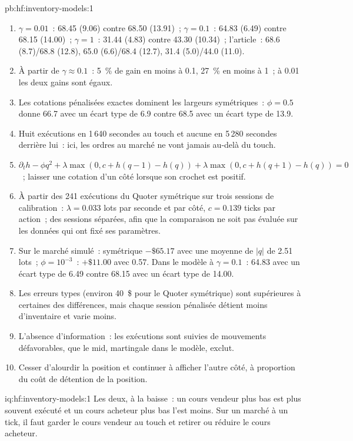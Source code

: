 \begin{solution}{pb:hf:inventory-models:1}
\begin{enumerate}
\item $\gamma=0.01$~: 68.45 (9.06) contre 68.50 (13.91)~; $\gamma=0.1$~: 64.83 (6.49) contre 68.15 (14.00)~; $\gamma=1$~: 31.44 (4.83) contre 43.30
(10.34)~; l'article~: 68.6 (8.7)/68.8 (12.8), 65.0 (6.6)/68.4 (12.7), 31.4 (5.0)/44.0 (11.0).
\item À partir de $\gamma\approx0.1$~: 5~\% de gain en moins à 0.1, 27~\% en moins à 1~; à 0.01 les deux gains sont égaux.
\item Les cotations pénalisées exactes dominent les largeurs symétriques~: $\phi=0.5$ donne 66.7 avec un écart type de 6.9 contre 68.5 avec un écart type de 13.9.
\item Huit exécutions en 1\,640 secondes au touch et aucune en 5\,280 secondes derrière lui~: ici, les ordres au marché ne vont jamais au-delà du touch.
\item $\partial_th-\phi q^2+\lambda\max(0,c+h(q-1)-h(q))+\lambda\max(0,c+h(q+1)-h(q))=0$~; laisser une cotation d'un côté lorsque son crochet est positif.
\item À partir des 241 exécutions du Quoter symétrique sur trois sessions de calibration~: $\lambda=0.033$ lots par seconde et par côté, $c=0.139$ ticks par action~; des sessions
séparées, afin que la comparaison ne soit pas évaluée sur les données qui ont fixé ses paramètres.
\item Sur le marché simulé~: symétrique $-\$65.17$ avec une moyenne de $|q|$ de 2.51 lots~; $\phi=10^{-3}$~: $+\$11.00$ avec 0.57. Dans le modèle à $\gamma=0.1$~:
64.83 avec un écart type de 6.49 contre 68.15 avec un écart type de 14.00.
\item Les erreurs types (environ 40~\$ pour le Quoter symétrique) sont supérieures à certaines des différences, mais chaque session pénalisée détient moins
d'inventaire et varie moins.
\item L'absence d'information~: les exécutions sont suivies de mouvements défavorables, que le mid, martingale dans le modèle, exclut.
\item Cesser d'alourdir la position et continuer à afficher l'autre côté, à proportion du coût de détention de la position.
\end{enumerate}
\end{solution}

\begin{solution}{iq:hf:inventory-models:1}
Les deux, à la baisse~: un cours vendeur plus bas est plus souvent exécuté et un cours acheteur plus bas l'est moins. Sur un marché à un tick, il faut garder le cours vendeur au touch et retirer ou réduire le cours acheteur.
\end{solution}

